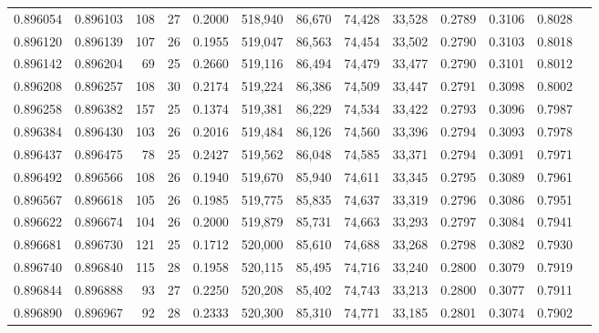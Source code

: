 \begin{tabular}{rrrrrrrrrrrrr}
0.896054 & 0.896103 &   108 &  27 &                                     0.2000 & 518,940 &  86,670 &  74,428 &  33,528 & 0.2789 & 0.3106 & 0.8028 \\
0.896120 & 0.896139 &   107 &  26 &                                     0.1955 & 519,047 &  86,563 &  74,454 &  33,502 & 0.2790 & 0.3103 & 0.8018 \\
0.896142 & 0.896204 &    69 &  25 &                                     0.2660 & 519,116 &  86,494 &  74,479 &  33,477 & 0.2790 & 0.3101 & 0.8012 \\
0.896208 & 0.896257 &   108 &  30 &                                     0.2174 & 519,224 &  86,386 &  74,509 &  33,447 & 0.2791 & 0.3098 & 0.8002 \\
0.896258 & 0.896382 &   157 &  25 &                                     0.1374 & 519,381 &  86,229 &  74,534 &  33,422 & 0.2793 & 0.3096 & 0.7987 \\
0.896384 & 0.896430 &   103 &  26 &                                     0.2016 & 519,484 &  86,126 &  74,560 &  33,396 & 0.2794 & 0.3093 & 0.7978 \\
0.896437 & 0.896475 &    78 &  25 &                                     0.2427 & 519,562 &  86,048 &  74,585 &  33,371 & 0.2794 & 0.3091 & 0.7971 \\
0.896492 & 0.896566 &   108 &  26 &                                     0.1940 & 519,670 &  85,940 &  74,611 &  33,345 & 0.2795 & 0.3089 & 0.7961 \\
0.896567 & 0.896618 &   105 &  26 &                                     0.1985 & 519,775 &  85,835 &  74,637 &  33,319 & 0.2796 & 0.3086 & 0.7951 \\
0.896622 & 0.896674 &   104 &  26 &                                     0.2000 & 519,879 &  85,731 &  74,663 &  33,293 & 0.2797 & 0.3084 & 0.7941 \\
0.896681 & 0.896730 &   121 &  25 &                                     0.1712 & 520,000 &  85,610 &  74,688 &  33,268 & 0.2798 & 0.3082 & 0.7930 \\
0.896740 & 0.896840 &   115 &  28 &                                     0.1958 & 520,115 &  85,495 &  74,716 &  33,240 & 0.2800 & 0.3079 & 0.7919 \\
0.896844 & 0.896888 &    93 &  27 &                                     0.2250 & 520,208 &  85,402 &  74,743 &  33,213 & 0.2800 & 0.3077 & 0.7911 \\
0.896890 & 0.896967 &    92 &  28 &                                     0.2333 & 520,300 &  85,310 &  74,771 &  33,185 & 0.2801 & 0.3074 & 0.7902 \\

\end{tabular}
